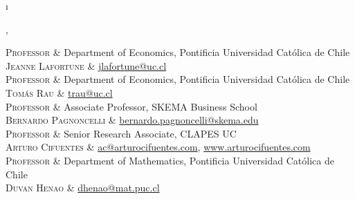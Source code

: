 \documentclass[a4paper, 10pt]{article}
\newcommand{\tablength}{}
\newcommand{\setCols}[1]{			%
	\ifnum0=\i						%
		\ifdim0cm=#1				%
			\def \firstCol {r}		%
		\else						%
			\def \firstCol {p{#1}}	%
		\fi							%
	\else \ifnum1=\i				%
		\ifdim0cm=#1				%
			\def \secondCol {l}		%
		\else						%
			\def \secondCol{p{#1}}	%
		\fi							%
	\else \ifnum2=\i				%
		\ifnum0=#1					%
			\def \sep {}			%
		\else						%
			\def \sep {|}			%
		\fi							%
	\fi \fi \fi						%
	\advance\i by1					%
}
\newcommand{\tab}[1]{							%
	\newcount\i									%
	\forlistloop{\setCols}{\tablength}			%
	\begin{tabular}{\firstCol \sep \secondCol}	%
		#1										%
	\end{tabular} \\[.5ex]						%
}
\begin{document}
\tab{
\textsc{Professor}
	&	Department of Economics, Pontificia Universidad Católica de Chile		\\[0.2ex]
\textsc{Jeanne Lafortune}
	& 	\href{mailto:jlafortune@uc.cl}{jlafortune@uc.cl}					\\[1.5ex]

\textsc{Professor}
	&	Department of Economics, Pontificia Universidad Católica de Chile		\\[0.2ex]
\textsc{Tomás Rau}
	& 	\href{mailto:trau@uc.cl}{trau@uc.cl}							\\[1.5ex]

\textsc{Professor}
	&	Associate Professor, SKEMA Business School				\\[0.2ex]
\textsc{Bernardo Pagnoncelli}
	& 	\href{mailto:bernardo.pagnoncelli@skema.edu}{bernardo.pagnoncelli@skema.edu}	\\[1.5ex]

\textsc{Professor}
	&	Senior Research Associate, CLAPES UC	 					\\[0.2ex]
\textsc{Arturo Cifuentes}
	& 	\href{mailto:ac@arturocifuentes.com}{ac@arturocifuentes.com}, \href{http://www.arturocifuentes.com/}{www.arturocifuentes.com}		\\[1.5ex]

\textsc{Professor}
	&	Department of Mathematics, Pontificia Universidad Católica de Chile	\\[0.2ex]
\textsc{Duvan Henao}
	& 	\href{mailto:dhenao@mat.puc.cl}{dhenao@mat.puc.cl}			\\[1.5ex]
}
\end{document}
